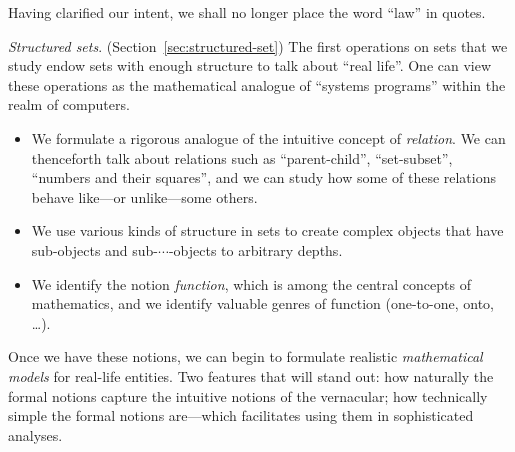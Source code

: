 \noindent
Having clarified our intent, we shall no longer place the word ``law''
in quotes.

\bigskip

{\it Structured sets}. 
(Section~\ref{sec:structured-set}) The first operations on sets that
we study endow sets with enough structure to talk about ``real life''.
One can view these operations as the mathematical analogue of
``systems programs'' within the realm of computers.
\begin{itemize}
\item
We formulate a rigorous analogue of the intuitive concept of {\it
  relation}.  We can thenceforth talk about relations such as
``parent-child'', ``set-subset'', ``numbers and their squares'', and
we can study how some of these relations behave like---or
unlike---some others.
\item
We use various kinds of structure in sets to create complex objects
that have sub-objects and sub-$\cdots$-objects to arbitrary depths.
\item
We identify the notion {\it function}, which is among the central
concepts of mathematics, and we identify valuable genres of function
(one-to-one, onto, \ldots).
\end{itemize}
Once we have these notions, we can begin to formulate realistic {\it
  mathematical models} for real-life entities.  Two features that will
stand out: how naturally the formal notions capture the intuitive
notions of the vernacular; how technically simple the formal notions
are---which facilitates using them in sophisticated analyses.

\bigskip

